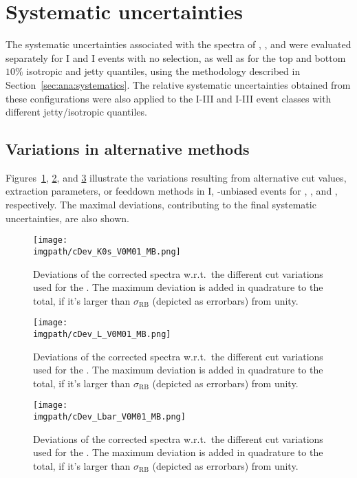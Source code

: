 \section{Systematic uncertainties}

The systematic uncertainties associated with the \pt spectra of \KOs, \LA, and \AL were evaluated separately for \NSPD I and \VOM I events with no \SOPT selection, as well as for the top and bottom $10\%$ isotropic and jetty quantiles, using the methodology described in Section~\ref{sec:ana:systematics}. The relative systematic uncertainties obtained from these configurations were also applied to the \NSPD I-III and \VOM I-III event classes with different jetty/isotropic quantiles.

\subsection{Variations in alternative methods}

Figures~\ref{fig:sphero:systK0s}, \ref{fig:sphero:systLA}, and \ref{fig:sphero:systAL} illustrate the variations resulting from alternative cut values, extraction parameters, or feeddown methods in \VOM I, \SOPT-unbiased events for \KOs, \LA, and \AL, respectively. The maximal deviations, contributing to the final systematic uncertainties, are also shown.

\begin{figure}[!h]
  \centering
\texttt{[image: \\imgpath/cDev\_K0s\_V0M01\_MB.png]}
  \caption{Deviations of the corrected spectra w.r.t.\ the different cut variations used for the \Ks . The maximum deviation is added in quadrature to the total, if it's larger than $\sigma_\mathrm{RB}$ (depicted as errorbars) from unity.}
  \label{fig:sphero:systK0s}
\end{figure}

\begin{figure}[!h]
  \centering
\texttt{[image: \\imgpath/cDev\_L\_V0M01\_MB.png]}
  \caption{Deviations of the corrected spectra w.r.t.\ the different cut variations used for the \Ks . The maximum deviation is added in quadrature to the total, if it's larger than $\sigma_\mathrm{RB}$ (depicted as errorbars) from unity.}
  \label{fig:sphero:systLA}
\end{figure}

\begin{figure}[!h]
  \centering
\texttt{[image: \\imgpath/cDev\_Lbar\_V0M01\_MB.png]}
  \caption{Deviations of the corrected spectra w.r.t.\ the different cut variations used for the \Ks . The maximum deviation is added in quadrature to the total, if it's larger than $\sigma_\mathrm{RB}$ (depicted as errorbars) from unity.}
  \label{fig:sphero:systAL}
\end{figure}

